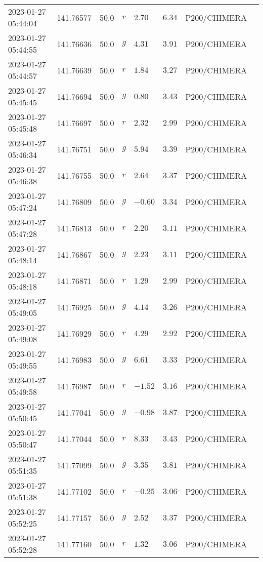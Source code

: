 \documentclass{nature_plusfigure}
\begin{document}
\begin{supplement}
\begin{center}
\begin{longtable}{llllllll}
2023-01-27 05:44:04 & 141.76577 & 50.0 & $r$ & $2.70$ & $6.34$ & P200/CHIMERA &  \\ 
2023-01-27 05:44:55 & 141.76636 & 50.0 & $g$ & $4.31$ & $3.91$ & P200/CHIMERA &  \\ 
2023-01-27 05:44:57 & 141.76639 & 50.0 & $r$ & $1.84$ & $3.27$ & P200/CHIMERA &  \\ 
2023-01-27 05:45:45 & 141.76694 & 50.0 & $g$ & $0.80$ & $3.43$ & P200/CHIMERA &  \\ 
2023-01-27 05:45:48 & 141.76697 & 50.0 & $r$ & $2.32$ & $2.99$ & P200/CHIMERA &  \\ 
2023-01-27 05:46:34 & 141.76751 & 50.0 & $g$ & $5.94$ & $3.39$ & P200/CHIMERA &  \\ 
2023-01-27 05:46:38 & 141.76755 & 50.0 & $r$ & $2.64$ & $3.37$ & P200/CHIMERA &  \\ 
2023-01-27 05:47:24 & 141.76809 & 50.0 & $g$ & $-0.60$ & $3.34$ & P200/CHIMERA &  \\ 
2023-01-27 05:47:28 & 141.76813 & 50.0 & $r$ & $2.20$ & $3.11$ & P200/CHIMERA &  \\ 
2023-01-27 05:48:14 & 141.76867 & 50.0 & $g$ & $2.23$ & $3.11$ & P200/CHIMERA &  \\ 
2023-01-27 05:48:18 & 141.76871 & 50.0 & $r$ & $1.29$ & $2.99$ & P200/CHIMERA &  \\ 
2023-01-27 05:49:05 & 141.76925 & 50.0 & $g$ & $4.14$ & $3.26$ & P200/CHIMERA &  \\ 
2023-01-27 05:49:08 & 141.76929 & 50.0 & $r$ & $4.29$ & $2.92$ & P200/CHIMERA &  \\ 
2023-01-27 05:49:55 & 141.76983 & 50.0 & $g$ & $6.61$ & $3.33$ & P200/CHIMERA &  \\ 
2023-01-27 05:49:58 & 141.76987 & 50.0 & $r$ & $-1.52$ & $3.16$ & P200/CHIMERA &  \\ 
2023-01-27 05:50:45 & 141.77041 & 50.0 & $g$ & $-0.98$ & $3.87$ & P200/CHIMERA &  \\ 
2023-01-27 05:50:47 & 141.77044 & 50.0 & $r$ & $8.33$ & $3.43$ & P200/CHIMERA &  \\ 
2023-01-27 05:51:35 & 141.77099 & 50.0 & $g$ & $3.35$ & $3.81$ & P200/CHIMERA &  \\ 
2023-01-27 05:51:38 & 141.77102 & 50.0 & $r$ & $-0.25$ & $3.06$ & P200/CHIMERA &  \\ 
2023-01-27 05:52:25 & 141.77157 & 50.0 & $g$ & $2.52$ & $3.37$ & P200/CHIMERA &  \\ 
2023-01-27 05:52:28 & 141.77160 & 50.0 & $r$ & $1.32$ & $3.06$ & P200/CHIMERA &  \\ 

\end{longtable}
\end{center}
\end{supplement}
\end{document}
